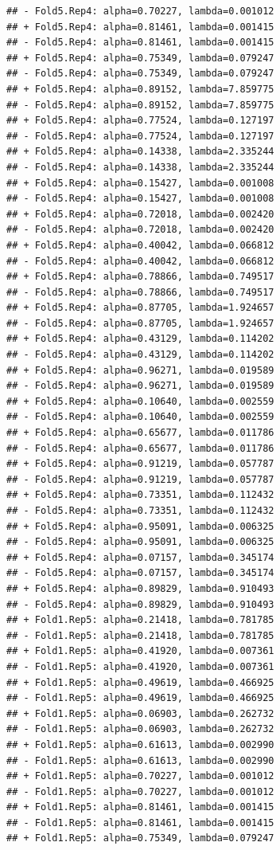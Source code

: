 \documentclass[
]{article}
\begin{document}
\begin{verbatim}
## - Fold5.Rep4: alpha=0.70227, lambda=0.001012 
## + Fold5.Rep4: alpha=0.81461, lambda=0.001415 
## - Fold5.Rep4: alpha=0.81461, lambda=0.001415 
## + Fold5.Rep4: alpha=0.75349, lambda=0.079247 
## - Fold5.Rep4: alpha=0.75349, lambda=0.079247 
## + Fold5.Rep4: alpha=0.89152, lambda=7.859775 
## - Fold5.Rep4: alpha=0.89152, lambda=7.859775 
## + Fold5.Rep4: alpha=0.77524, lambda=0.127197 
## - Fold5.Rep4: alpha=0.77524, lambda=0.127197 
## + Fold5.Rep4: alpha=0.14338, lambda=2.335244 
## - Fold5.Rep4: alpha=0.14338, lambda=2.335244 
## + Fold5.Rep4: alpha=0.15427, lambda=0.001008 
## - Fold5.Rep4: alpha=0.15427, lambda=0.001008 
## + Fold5.Rep4: alpha=0.72018, lambda=0.002420 
## - Fold5.Rep4: alpha=0.72018, lambda=0.002420 
## + Fold5.Rep4: alpha=0.40042, lambda=0.066812 
## - Fold5.Rep4: alpha=0.40042, lambda=0.066812 
## + Fold5.Rep4: alpha=0.78866, lambda=0.749517 
## - Fold5.Rep4: alpha=0.78866, lambda=0.749517 
## + Fold5.Rep4: alpha=0.87705, lambda=1.924657 
## - Fold5.Rep4: alpha=0.87705, lambda=1.924657 
## + Fold5.Rep4: alpha=0.43129, lambda=0.114202 
## - Fold5.Rep4: alpha=0.43129, lambda=0.114202 
## + Fold5.Rep4: alpha=0.96271, lambda=0.019589 
## - Fold5.Rep4: alpha=0.96271, lambda=0.019589 
## + Fold5.Rep4: alpha=0.10640, lambda=0.002559 
## - Fold5.Rep4: alpha=0.10640, lambda=0.002559 
## + Fold5.Rep4: alpha=0.65677, lambda=0.011786 
## - Fold5.Rep4: alpha=0.65677, lambda=0.011786 
## + Fold5.Rep4: alpha=0.91219, lambda=0.057787 
## - Fold5.Rep4: alpha=0.91219, lambda=0.057787 
## + Fold5.Rep4: alpha=0.73351, lambda=0.112432 
## - Fold5.Rep4: alpha=0.73351, lambda=0.112432 
## + Fold5.Rep4: alpha=0.95091, lambda=0.006325 
## - Fold5.Rep4: alpha=0.95091, lambda=0.006325 
## + Fold5.Rep4: alpha=0.07157, lambda=0.345174 
## - Fold5.Rep4: alpha=0.07157, lambda=0.345174 
## + Fold5.Rep4: alpha=0.89829, lambda=0.910493 
## - Fold5.Rep4: alpha=0.89829, lambda=0.910493 
## + Fold1.Rep5: alpha=0.21418, lambda=0.781785 
## - Fold1.Rep5: alpha=0.21418, lambda=0.781785 
## + Fold1.Rep5: alpha=0.41920, lambda=0.007361 
## - Fold1.Rep5: alpha=0.41920, lambda=0.007361 
## + Fold1.Rep5: alpha=0.49619, lambda=0.466925 
## - Fold1.Rep5: alpha=0.49619, lambda=0.466925 
## + Fold1.Rep5: alpha=0.06903, lambda=0.262732 
## - Fold1.Rep5: alpha=0.06903, lambda=0.262732 
## + Fold1.Rep5: alpha=0.61613, lambda=0.002990 
## - Fold1.Rep5: alpha=0.61613, lambda=0.002990 
## + Fold1.Rep5: alpha=0.70227, lambda=0.001012 
## - Fold1.Rep5: alpha=0.70227, lambda=0.001012 
## + Fold1.Rep5: alpha=0.81461, lambda=0.001415 
## - Fold1.Rep5: alpha=0.81461, lambda=0.001415 
## + Fold1.Rep5: alpha=0.75349, lambda=0.079247 

\end{verbatim}
\end{document}
